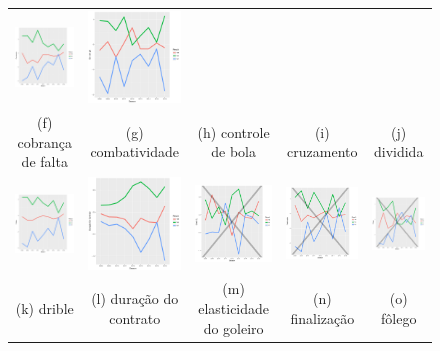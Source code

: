 \documentclass[doc,apacite,oneside,a4paper,12pt]{apa6}
\begin{document}
\begin{figure}
\begin{tabular}{ccccc}
  \includegraphics[width=25mm]{cruzamento_result} & \includegraphics[width=25mm]{div_empe_result} \\
 \scriptsize{(f) cobrança de falta } & \scriptsize{(g) combatividade } & \scriptsize{(h) controle de bola} & \scriptsize{(i) cruzamento} & \scriptsize{(j) dividida}\\[3pt]
 
 \includegraphics[width=25mm]{dribles_result} & \includegraphics[width=25mm]{duracaodocontrato_result} &   \includegraphics[width=25mm]{elast_gl_result} &
  \includegraphics[width=25mm]{finalizacao_result} & \includegraphics[width=25mm]{folego_result}  \\
 \scriptsize{(k) drible} & \scriptsize{(l) duração do contrato } & \scriptsize{(m) elasticidade do goleiro} & \scriptsize{(n) finalização} & \scriptsize{(o) fôlego}\\[3pt]
 

\end{tabular}
\end{figure}
\end{document}
